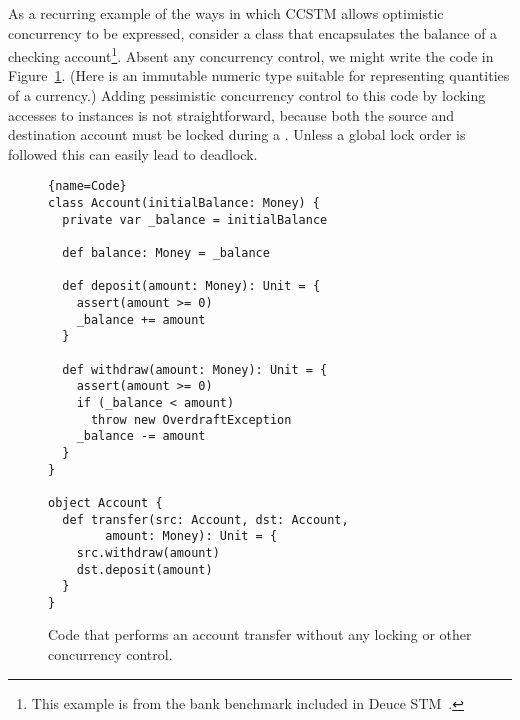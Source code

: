 As a recurring example of the ways in which CCSTM allows optimistic concurrency
to be expressed, consider a class that encapsulates the balance of a
checking account\footnote{This example is from the bank benchmark included
in Deuce STM~\cite{deucestm}.}.  Absent any concurrency control, we might
write the code in Figure~\ref{fig:example:nosync}.  (Here 
is an immutable numeric type suitable for representing quantities of
a currency.)  Adding pessimistic concurrency control to this code by
locking accesses to  instances is not straightforward,
because both the source and destination account must be locked during
a .  Unless a global lock order is followed this can
easily lead to deadlock.

\begin{figure}
\begin{lstlisting}{name=Code}
class Account(initialBalance: Money) {
  private var _balance = initialBalance

  def balance: Money = _balance

  def deposit(amount: Money): Unit = {
    assert(amount >= 0)
    _balance += amount
  }

  def withdraw(amount: Money): Unit = {
    assert(amount >= 0)
    if (_balance < amount)
      throw new OverdraftException
    _balance -= amount
  }
}

object Account {
  def transfer(src: Account, dst: Account,
        amount: Money): Unit = {
    src.withdraw(amount)
    dst.deposit(amount)
  }
}
\end{lstlisting}

\caption{Code that performs an account transfer without
any locking or other concurrency control.}

\label{fig:example:nosync}
\end{figure}

